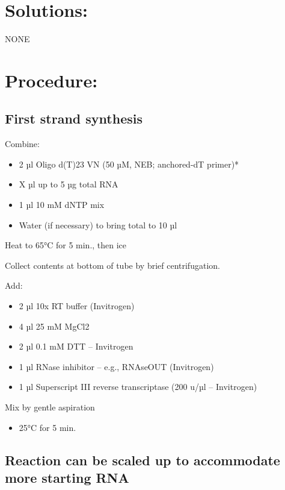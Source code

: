 \documentclass[
  letterpaper,
  DIV=11,
  numbers=noendperiod]{scrreprt}
\providecommand{\tightlist}{%
  \setlength{\itemsep}{0pt}\setlength{\parskip}{0pt}}\usepackage{longtable,booktabs,array}
\begin{document}
\hypertarget{solutions-1}{%
\section{Solutions:}\label{solutions-1}}

NONE

\hypertarget{procedure-1}{%
\section{Procedure:}\label{procedure-1}}

\hypertarget{first-strand-synthesis}{%
\subsection{First strand synthesis}\label{first-strand-synthesis}}

Combine:

\begin{itemize}
\tightlist
\item
  2 µl Oligo d(T)23 VN (50 µM, NEB; anchored-dT primer)*
\item
  X µl up to 5 µg total RNA
\item
  1 µl 10 mM dNTP mix
\item
  Water (if necessary) to bring total to 10 µl
\end{itemize}

Heat to 65°C for 5 min., then ice

Collect contents at bottom of tube by brief centrifugation.

Add:

\begin{itemize}
\tightlist
\item
  2 µl 10x RT buffer (Invitrogen)
\item
  4 µl 25 mM MgCl2
\item
  2 µl 0.1 mM DTT -- Invitrogen
\item
  1 µl RNase inhibitor -- e.g., RNAseOUT (Invitrogen)
\item
  1 µl Superscript III reverse transcriptase (200 u/µl -- Invitrogen)
\end{itemize}

Mix by gentle aspiration

\begin{itemize}
\tightlist
\item
  25°C for 5 min.
\end{itemize}

\hypertarget{reaction-can-be-scaled-up-to-accommodate-more-starting-rna}{%
\subsection{Reaction can be scaled up to accommodate more starting
RNA}\label{reaction-can-be-scaled-up-to-accommodate-more-starting-rna}}
\end{document}
